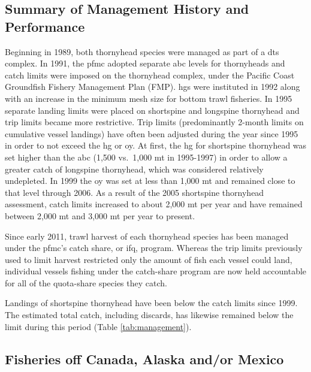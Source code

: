 \documentclass[11pt,
  english,
  letterpaper,
]{article}
\begin{document}
\hypertarget{summary-of-management-history-and-performance}{%
\subsection{Summary of Management History and Performance}\label{summary-of-management-history-and-performance}}

Beginning in 1989, both thornyhead species were managed as part of a \gls{dts} complex. In 1991, the \gls{pfmc} adopted separate \gls{abc} levels for thornyheads and catch limits were imposed on the thornyhead complex, under the Pacific Coast Groundfish Fishery Management Plan (FMP). \Gls{hg}s were instituted in 1992 along with an increase in the minimum mesh size for bottom trawl fisheries. In 1995 separate landing limits were placed on shortspine and longspine thornyhead and trip limits became more restrictive. Trip limits (predominantly 2-month limits on cumulative vessel landings) have often been adjusted during the year since 1995 in order to not exceed the \Gls{hg} or \gls{oy}. At first, the \gls{hg} for shortspine thornyhead was set higher than the \gls{abc} (1,500 vs.~1,000 mt in 1995-1997) in order to allow a greater catch of longspine thornyhead, which was considered relatively undepleted. In 1999 the \gls{oy} was set at less than 1,000 mt and remained close to that level through 2006. As a result of the 2005 shortspine thornyhead assessment, catch limits increased to about 2,000 mt per year and have remained between 2,000 mt and 3,000 mt per year to present.

Since early 2011, trawl harvest of each thornyhead species has been managed under the \gls{pfmc}'s catch share, or \gls{ifq}, program. Whereas the trip limits previously used to limit harvest restricted only the amount of fish each vessel could land, individual vessels fishing under the catch-share program are now held accountable for all of the quota-share species they catch.

Landings of shortspine thornyhead have been below the catch limits since 1999. The estimated total catch, including discards, has likewise remained below the limit during this period (Table \ref{tab:management}).

\hypertarget{fisheries-off-canada-alaska-andor-mexico}{%
\subsection{Fisheries off Canada, Alaska and/or Mexico}\label{fisheries-off-canada-alaska-andor-mexico}}
\end{document}
